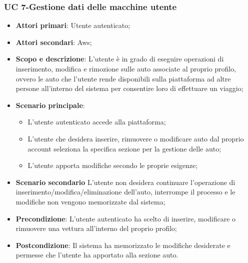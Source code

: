         
        
    \subsubsection{UC 7-Gestione dati delle macchine utente}
      \begin{itemize}
                \item \textbf{Attori primari}: Utente autenticato;
                \item \textbf{Attori secondari}: Aws;
                 \item \textbf{Scopo e descrizione}: L'utente è in grado di eseguire operazioni di inserimento, modifica e rimozione sulle auto associate al proprio profilo, ovvero le auto che l'utente rende disponibili sulla piattaforma ad altre persone all'interno del sistema per consentire loro di effettuare un viaggio;
                 \item \textbf{Scenario principale}: 
                 \begin{itemize}
                     \item L'utente autenticato accede alla piattaforma;
                     \item L’utente che desidera inserire, rimuovere o modificare auto dal proprio account seleziona la specifica sezione per la gestione delle auto;
                     \item L'utente apporta modifiche secondo le proprie esigenze;
                 \end{itemize}
                 \item \textbf{Scenario secondario} L'utente non desidera continuare l'operazione di inserimento/modifica/eliminazione dell'auto, interrompe il processo e le modifiche non vengono memorizzate dal sistema;
                 \item \textbf{Precondizione}: L'utente autenticato ha scelto di inserire, modificare o rimuovere una vettura all'interno del proprio profilo;
                 \item \textbf{Postcondizione}: Il sistema ha memorizzato le modifiche desiderate e permesse che l'utente ha apportato alla sezione auto.
                 \end{itemize}

